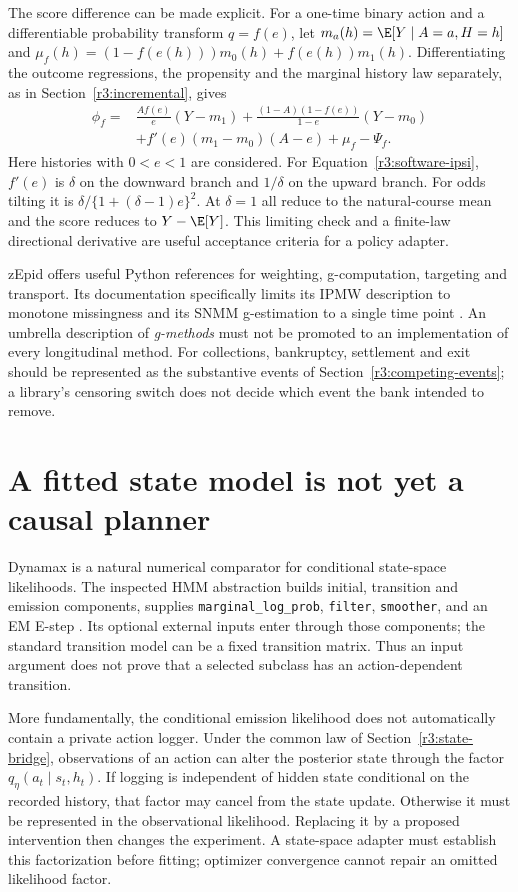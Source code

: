 The score difference can be made explicit. For a one-time binary action
and a differentiable probability transform $q=f(e)$, let
$m_a(h)=\E[Y\mid A=a,H=h]$ and
$\mu_f(h)=(1-f(e(h)))m_0(h)+f(e(h))m_1(h)$.
Differentiating the outcome regressions, the propensity and the marginal
history law separately, as in Section~\ref{r3:incremental}, gives
\begin{align*}
 \phi_f={}&\frac{Af(e)}{e}(Y-m_1)
       +\frac{(1-A)(1-f(e))}{1-e}(Y-m_0)\\
       &+f'(e)(m_1-m_0)(A-e)+\mu_f-\Psi_f .
\end{align*}
Here histories with $0<e<1$ are considered. For
Equation~\eqref{r3:software-ipsi}, $f'(e)$ is $\delta$ on the downward
branch and $1/\delta$ on the upward branch. For odds tilting it is
$\delta/\{1+(\delta-1)e\}^2$. At $\delta=1$ all reduce to the natural-course
mean and the score reduces to $Y-\E[Y]$. This limiting check and a finite-law
directional derivative are useful acceptance criteria for a policy adapter.

zEpid offers useful Python references for weighting, g-computation,
targeting and transport. Its documentation specifically limits its IPMW
description to monotone missingness and its SNMM g-estimation to a single
time point \citep{sw_zepid}. An umbrella description of \emph{g-methods}
must not be promoted to an implementation of every longitudinal method.
For collections, bankruptcy, settlement and exit should be represented
as the substantive events of Section~\ref{r3:competing-events}; a library's
censoring switch does not decide which event the bank intended to remove.

\section{A fitted state model is not yet a causal planner}
\label{r3:software-states}

Dynamax is a natural numerical comparator for conditional state-space
likelihoods. The inspected HMM abstraction builds initial, transition and
emission components, supplies \texttt{marginal\_log\_prob},
\texttt{filter}, \texttt{smoother}, and an EM E-step
\citep{sw_dynamax}. Its optional external inputs enter through those
components; the standard transition model can be a fixed transition
matrix. Thus an input argument does not prove that a selected subclass
has an action-dependent transition.

More fundamentally, the conditional emission likelihood does not
automatically contain a private action logger. Under the common law of
Section~\ref{r3:state-bridge}, observations of an action can alter the
posterior state through the factor $q_\eta(a_t\mid s_t,h_t)$. If logging is
independent of hidden state conditional on the recorded history, that
factor may cancel from the state update. Otherwise it must be represented
in the observational likelihood. Replacing it by a proposed intervention
then changes the experiment. A state-space adapter must establish this
factorization before fitting; optimizer convergence cannot repair an
omitted likelihood factor.

